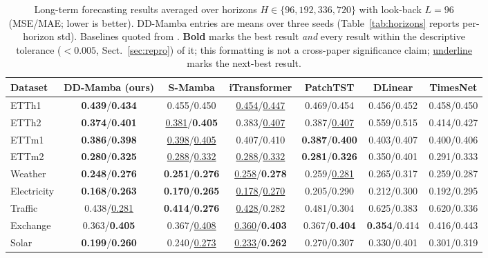 \documentclass[runningheads]{llncs}
\newcommand{\model}{DD-Mamba}
\newcommand{\best}[1]{\textbf{#1}}
\newcommand{\second}[1]{\underline{#1}}
\begin{document}
\begin{table}[tb]
\centering
\caption{Long-term forecasting results averaged over horizons
$H \in \{96,192,336,720\}$ with look-back $L{=}96$ (MSE/MAE; lower is
better). \model{} entries are means over three seeds
(Table~\ref{tab:horizons} reports per-horizon std). Baselines quoted from
\cite{smamba}. \textbf{Bold} marks the
best result \emph{and} every result within the descriptive tolerance
($<0.005$, Sect.~\ref{sec:repro}) of it; this formatting is not a
cross-paper significance claim;
\underline{underline} marks the next-best result.}
\label{tab:main}
\scriptsize
\setlength{\tabcolsep}{2.6pt}
\begin{tabular}{@{}lcccccc@{}}
\toprule
Dataset & \model{} (ours) & S-Mamba & iTransformer & PatchTST & DLinear & TimesNet \\
\midrule
ETTh1 & \best{0.439}/\best{0.434} & 0.455/0.450 & \second{0.454}/\second{0.447} & 0.469/0.454 & 0.456/0.452 & 0.458/0.450 \\
ETTh2 & \best{0.374}/\best{0.401} & \second{0.381}/\best{0.405} & 0.383/\second{0.407} & 0.387/\second{0.407} & 0.559/0.515 & 0.414/0.427 \\
ETTm1 & \best{0.386}/\best{0.398} & \second{0.398}/\second{0.405} & 0.407/0.410 & \best{0.387}/\best{0.400} & 0.403/0.407 & 0.400/0.406 \\
ETTm2 & \best{0.280}/\best{0.325} & \second{0.288}/\second{0.332} & \second{0.288}/\second{0.332} & \best{0.281}/\best{0.326} & 0.350/0.401 & 0.291/0.333 \\
Weather & \best{0.248}/\best{0.276} & \best{0.251}/\best{0.276} & \second{0.258}/\best{0.278} & 0.259/\second{0.281} & 0.265/0.317 & 0.259/0.287 \\
Electricity & \best{0.168}/\best{0.263} & \best{0.170}/\best{0.265} & \second{0.178}/\second{0.270} & 0.205/0.290 & 0.212/0.300 & 0.192/0.295 \\
Traffic & 0.438/\second{0.281} & \best{0.414}/\best{0.276} & \second{0.428}/0.282 & 0.481/0.304 & 0.625/0.383 & 0.620/0.336 \\
Exchange & 0.363/\best{0.405} & 0.367/\second{0.408} & \second{0.360}/\best{0.403} & 0.367/\best{0.404} & \best{0.354}/0.414 & 0.416/0.443 \\
Solar & \best{0.199}/\best{0.260} & 0.240/\second{0.273} & \second{0.233}/\best{0.262} & 0.270/0.307 & 0.330/0.401 & 0.301/0.319 \\
\bottomrule
\end{tabular}
\end{table}
\end{document}
